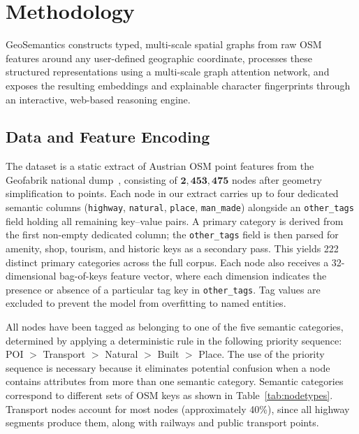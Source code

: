 \documentclass[]{interact}
\theoremstyle{plain}%
\theoremstyle{definition}
\theoremstyle{remark}
\begin{document}
\section{Methodology}
\label{sec:method}

GeoSemantics constructs typed, multi-scale spatial graphs from raw OSM features around any user-defined geographic coordinate, processes these structured representations using a multi-scale graph attention network, and exposes the resulting embeddings and explainable character fingerprints through an interactive, web-based reasoning engine.

\subsection{Data and Feature Encoding}
\label{sec:data}

The dataset is a static extract of Austrian OSM point features from the Geofabrik national dump~\citep{geofabrik2024}, consisting of $\mathbf{2{,}453{,}475}$ nodes after geometry simplification to points. Each node in our extract carries up to four dedicated semantic columns (\texttt{highway}, \texttt{natural}, \texttt{place}, \texttt{man\_made}) alongside an \texttt{other\_tags} field holding all remaining key--value pairs. A primary category is derived from the first non-empty dedicated column; the \texttt{other\_tags} field is then parsed for amenity, shop, tourism, and historic keys as a secondary pass. This yields 222 distinct primary categories across the full corpus. Each node also receives a 32-dimensional bag-of-keys feature vector, where each dimension indicates the presence or absence of a particular tag key in \texttt{other\_tags}. Tag values are excluded to prevent the model from overfitting to named entities.

All nodes have been tagged as belonging to one of the five semantic categories, determined by applying a deterministic rule in the following priority sequence: POI $>$ Transport $>$ Natural $>$ Built $>$ Place. The use of the priority sequence is necessary because it eliminates potential confusion when a node contains attributes from more than one semantic category. Semantic categories correspond to different sets of OSM keys as shown in Table~\ref{tab:nodetypes}. Transport nodes account for most nodes (approximately 40\%), since all highway segments produce them, along with railways and public transport points.
\end{document}
